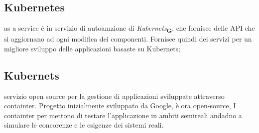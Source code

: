 \section{}
\subsection*{Kubernetes} as a service é in servizio di autoamzione di \textit{Kubernets}\textsubscript{\textbf{G}}, che fornisce delle API che si aggiornano ad ogni modifica dei componenti. Fornisce quindi dei servizi per un migliore sviluppo delle applicazioni basaste su Kubernets;
\subsection*{Kubernets} servizio open source per la gestione di applicazioni sviluppate attraverso containter. Progetto inizialmente sviluppato da Google, è ora open-source, I containter per mettono di testare l'applicazione in ambiti semireali andadno a simulare le concorenze e le esigenze dei sistemi reali.
